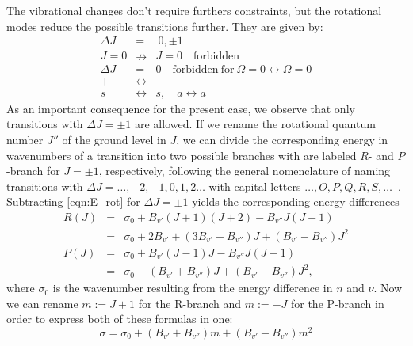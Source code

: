 The vibrational changes don't require furthers constraints, but the rotational 
modes reduce the possible transitions further. They are given by:
\begin{eqnarray}
    \Delta J \ &=&  \  0, \pm 1 \\
    J = 0 &\nrightarrow& J = 0 \quad \mathrm{forbidden}\\
    \Delta J &=& 0 \quad \mathrm{forbidden \ for \ } \Omega = 0 \leftrightarrow \Omega = 0 \\
    + &\leftrightarrow& - \\
    s &\leftrightarrow& s, \quad a \leftrightarrow a
\end{eqnarray}
As an important consequence for the present case, we observe that only 
transitions with $\Delta J = \pm1$ are allowed. If we rename the rotational 
quantum number $J''$ of the ground level in $J$, we can divide the corresponding 
energy in wavenumbers of a transition into two possible branches with are 
labeled $R$- and $P$-branch for $J = \pm 1$, respectively, following the 
general nomenclature of naming transitions with $\Delta J = \ldots, -2, -1, 0, 1, 2 \ldots$ 
with capital letters $\ldots, O, P, Q, R, S, \ldots$~\cite{lefebvre2004spectra}.
Subtracting \eqref{eqn:E_rot} 
for $\Delta J = \pm1$ yields the corresponding 
energy differences
\begin{eqnarray}
    R(J) &=& \sigma_0 + B_{v'}(J + 1)(J + 2) - B_{v''}J (J + 1) \nonumber \\
         &=& \sigma_0 + 2 B_{v'} + (3 B_{v'} - B_{v''})J + (B_{v'} - B_{v''})J^2 \\
    P(J) &=& \sigma_0 + B_{v'}(J - 1)J - B_{v''}J (J - 1) \nonumber \\
         &=& \sigma_0 - (B_{v'} + B_{v''})J + (B_{v'} - B_{v''})J^2,
\end{eqnarray}
where $\sigma_0$ is the wavenumber resulting from the energy difference in 
$n$ and $\nu$. 
Now we can rename $m:= J+1$ for the R-branch and $m:= - J$ for 
the P-branch in order to express both of these formulas in one:
\begin{equation}
    \sigma = \sigma_0 + (B_{v'} + B_{v''})m
    +  (B_{v'} - B_{v''})m^2
\end{equation}

